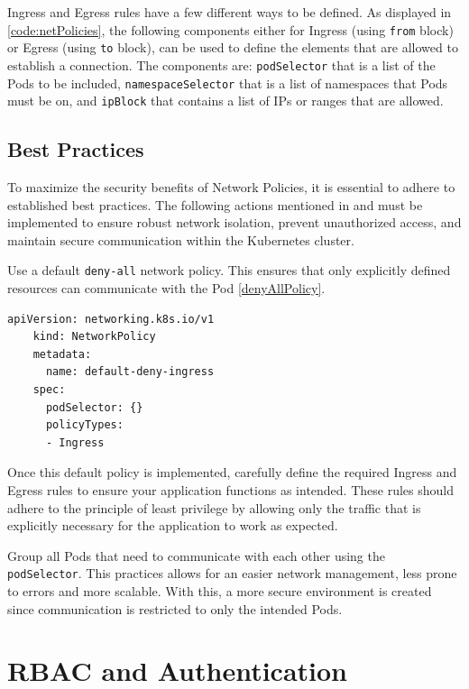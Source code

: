 \documentclass[a4paper,11pt,openright,BCOR=15mm]{scrbook}
\begin{document}
Ingress and Egress rules have a few different ways to be defined. As displayed in \ref{code:netPolicies}, the following components either for Ingress (using \texttt{from} block) or Egress (using \texttt{to} block), can be used to define the elements that are allowed to establish a connection. The components are: \texttt{podSelector} that is a list of the Pods to be included, \texttt{namespaceSelector} that is a list of namespaces that Pods must be on, and \texttt{ipBlock} that contains a list of IPs or ranges that are allowed.

\subsection{Best Practices}

To maximize the security benefits of Network Policies, it is essential to adhere to established best practices. The following actions mentioned in \cite{amaechi_learn_2023} and \cite{de_tender_kubernetes_2022} must be implemented to ensure robust network isolation, prevent unauthorized access, and maintain secure communication within the Kubernetes cluster.

Use a default \texttt{deny-all} network policy. This ensures that only explicitly defined resources can communicate with the Pod \ref{denyAllPolicy}.

\begin{lstlisting}[style=yaml,caption={Deny All Default Policy example},label=code:denyAllPolicy]
	apiVersion: networking.k8s.io/v1
	kind: NetworkPolicy
	metadata:
	  name: default-deny-ingress
	spec:
	  podSelector: {}
	  policyTypes:
	  - Ingress
\end{lstlisting}

Once this default policy is implemented, carefully define the required Ingress and Egress rules to ensure your application functions as intended. These rules should adhere to the principle of least privilege by allowing only the traffic that is explicitly necessary for the application to work as expected.

Group all Pods that need to communicate with each other using the \texttt{podSelector}. This practices allows for an easier network management, less prone to errors and more scalable. With this, a more secure environment is created since communication is restricted to only the intended Pods.

	\section{RBAC and Authentication}
	\label{sec:auth}
	
\end{document}
